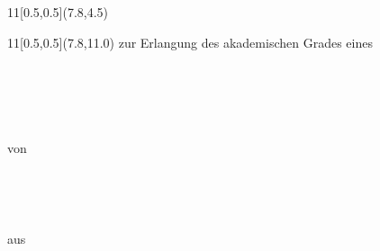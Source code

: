 \begin{titlepage}
\thispagestyle{empty}

%
\mbox{}%
 	\begin{textblock}{11}[0.5,0.5](7.8,4.5)
		\sffamily%
		\LARGE%
 		\centering%
		\textbf{\ThesisTitleDivided}
 	\end{textblock}

 	\begin{textblock}{11}[0.5,0.5](7.8,11.0)
 		\sffamily%
		\centering%
		zur Erlangung des akademischen Grades eines\\%
		\vspace{0.5\baselineskip}%
		\Large%
		\DocDegree%
		\vspace{1\baselineskip}\\%
		\normalsize%
		\Department\\%
		\UniversityGenitiv%
		\vspace{0.75\baselineskip}\\%
		\textbf{}%
		\vspace{0.5\baselineskip}\\%
		{\Large\TypeOfThesis}%
		\vspace{0.5\baselineskip}\\%
		\normalsize%
		von%
		\vspace{0.5\baselineskip}\\%
		\begin{showCurrentAutorTitle}%
		\AuthorTitle
		\vspace{0.5\baselineskip}\\%
		\end{showCurrentAutorTitle}%
		\textbf{\Large%
		\AuthorName}%
		\vspace{0.5\baselineskip}\\%
		\normalsize%
		\begin{showPlaceOfBirth}%
		aus \PlaceOfBirth%
		\end{showPlaceOfBirth}%
 	\end{textblock}


\end{titlepage}
